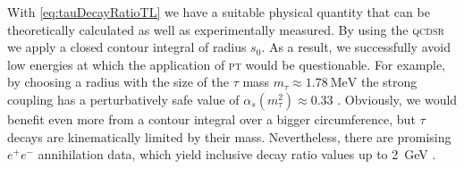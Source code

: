 \documentclass[../../index.tex]{subfiles}
\begin{document}
With \cref{eq:tauDecayRatioTL} we have a suitable physical quantity that can be
theoretically calculated as well as experimentally measured. By using the
\textsc{qcdsr} we apply a closed contour integral of radius \(s_0\). As a
result, we successfully avoid low energies at which the application of
\textsc{pt} would be questionable. For example, by choosing a radius with the
size of the \(\tau\) mass \(m_\tau \approx \SI{1.78}{\mega\eV}\) the strong
coupling has a perturbatively safe value of \(\alpha_s(m_\tau^2)\approx
0.33\) \cite{Pich2016}. Obviously, we would benefit even more from a contour
integral over a bigger circumference, but \(\tau\) decays are kinematically
limited by their mass. Nevertheless, there are promising \(e^+e^-\) annihilation
data, which yield inclusive decay ratio values up to \SI{2}{\giga\eV}
\cite{Boito2018}\cite{Keshavarzi2018}.
\end{document}
